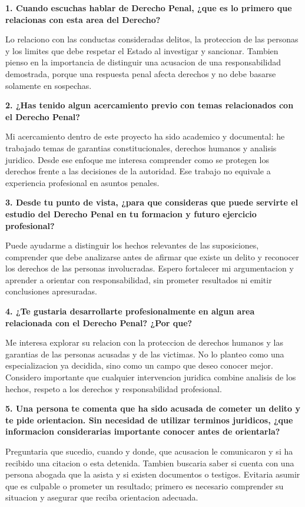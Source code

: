 \documentclass[spanish,letterpaper,oneside]{article}
\begin{document}
\begin{forobox}[title={Participacion principal -- propuesta no publicada}]

\textbf{1. Cuando escuchas hablar de Derecho Penal, ¿que es lo primero
que relacionas con esta area del Derecho?}

Lo relaciono con las conductas consideradas delitos, la proteccion de
las personas y los limites que debe respetar el Estado al investigar y
sancionar. Tambien pienso en la importancia de distinguir una acusacion
de una responsabilidad demostrada, porque una respuesta penal afecta
derechos y no debe basarse solamente en sospechas.

\textbf{2. ¿Has tenido algun acercamiento previo con temas relacionados
con el Derecho Penal?}

Mi acercamiento dentro de este proyecto ha sido academico y documental:
he trabajado temas de garantias constitucionales, derechos humanos y
analisis juridico. Desde ese enfoque me interesa comprender como se
protegen los derechos frente a las decisiones de la autoridad. Ese
trabajo no equivale a experiencia profesional en asuntos penales.

\textbf{3. Desde tu punto de vista, ¿para que consideras que puede
servirte el estudio del Derecho Penal en tu formacion y futuro ejercicio
profesional?}

Puede ayudarme a distinguir los hechos relevantes de las suposiciones,
comprender que debe analizarse antes de afirmar que existe un delito y
reconocer los derechos de las personas involucradas. Espero fortalecer
mi argumentacion y aprender a orientar con responsabilidad, sin prometer
resultados ni emitir conclusiones apresuradas.

\textbf{4. ¿Te gustaria desarrollarte profesionalmente en algun area
relacionada con el Derecho Penal? ¿Por que?}

Me interesa explorar su relacion con la proteccion de derechos humanos y
las garantias de las personas acusadas y de las victimas. No lo planteo
como una especializacion ya decidida, sino como un campo que deseo
conocer mejor. Considero importante que cualquier intervencion juridica
combine analisis de los hechos, respeto a los derechos y responsabilidad
profesional.

\textbf{5. Una persona te comenta que ha sido acusada de cometer un
delito y te pide orientacion. Sin necesidad de utilizar terminos
juridicos, ¿que informacion considerarias importante conocer antes de
orientarla?}

Preguntaria que sucedio, cuando y donde, que acusacion le comunicaron y
si ha recibido una citacion o esta detenida. Tambien buscaria saber si
cuenta con una persona abogada que la asista y si existen documentos o
testigos. Evitaria asumir que es culpable o prometer un resultado;
primero es necesario comprender su situacion y asegurar que reciba
orientacion adecuada.


\end{forobox}
\end{document}
